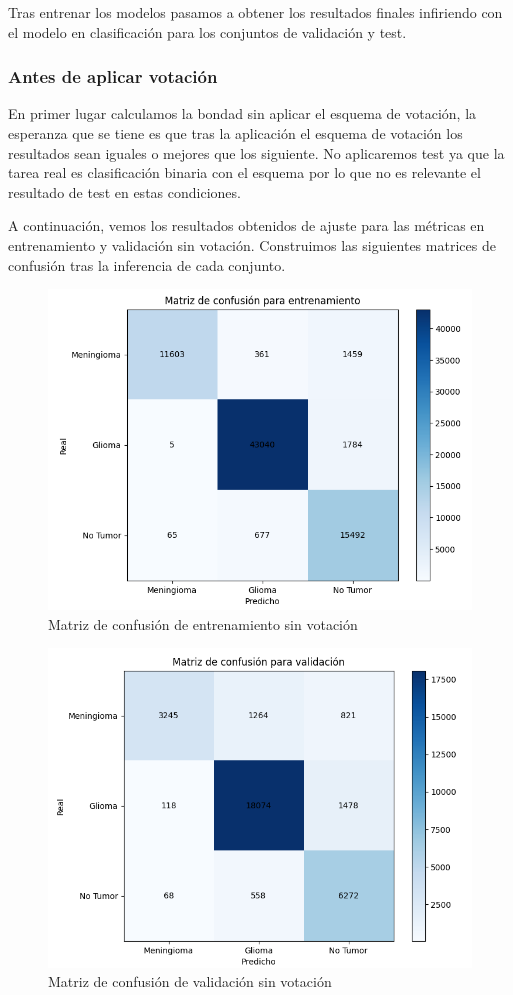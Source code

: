 Tras entrenar los modelos pasamos a obtener los resultados finales infiriendo con el modelo en clasificación para los conjuntos de validación y test.

\subsubsection{Antes de aplicar votación}

En primer lugar calculamos la bondad sin aplicar el esquema de votación, la esperanza que se tiene es que tras la aplicación el esquema de votación los resultados sean iguales o mejores que los siguiente. No aplicaremos test ya que la tarea real es clasificación binaria con el esquema por lo que no es relevante el resultado de test en estas condiciones. 

A continuación, vemos los resultados obtenidos de ajuste para las métricas en entrenamiento y validación sin votación. Construimos las siguientes matrices de confusión tras la inferencia de cada conjunto.
 
\begin{figure}[H]
	\centering
	\includegraphics[width=0.7\linewidth]{imagenes/task1_results_train.png}
	\caption{Matriz de confusión de entrenamiento sin votación}
\end{figure}

\begin{figure}[H]
	\centering
	\includegraphics[width=0.7\linewidth]{imagenes/task1_results_validation.png}
	\caption{Matriz de confusión de validación sin votación}
\end{figure}

